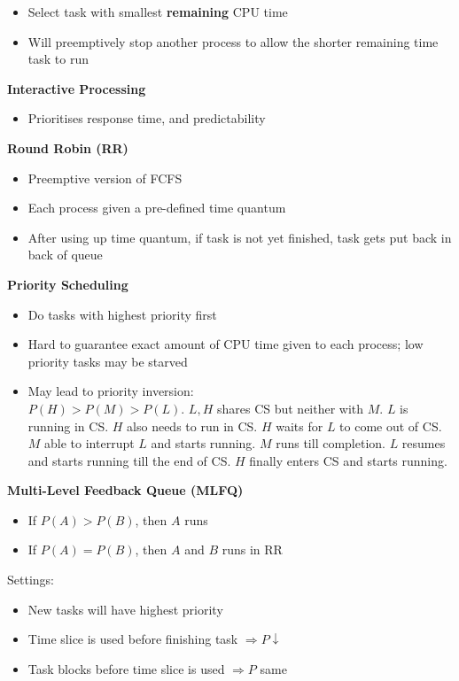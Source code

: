 \documentclass[a4paper, 12pt]{article}
\begin{document}
\begin{multicols*}{4}
\begin{itemize}
	\item Select task with smallest \textbf{remaining} CPU time
	\item Will preemptively stop another process to allow the shorter remaining time task to run
\end{itemize}
\textbf{Interactive Processing}
\begin{itemize}
	\item Prioritises response time, and predictability
\end{itemize}
\textbf{Round Robin (RR)}
\begin{itemize}
	\item Preemptive version of FCFS
	\item Each process given a pre-defined time quantum
	\item After using up time quantum, if task is not yet finished, task gets put back in back of queue
\end{itemize}
\textbf{Priority Scheduling}
\begin{itemize}
	\item Do tasks with highest priority first
	\item Hard to guarantee exact amount of CPU time given to each process; low priority tasks may be starved
	\item May lead to priority inversion: \\
		$P(H) > P(M) > P(L)$. $L,H$ shares CS but neither with $M$. $L$ is running in CS. $H$ also needs to run in CS. $H$ waits for $L$ to come out of CS. $M$ able to interrupt $L$ and starts running. $M$ runs till completion. $L$ resumes and starts running till the end of CS. $H$ finally enters CS and starts running.
\end{itemize}
\textbf{Multi-Level Feedback Queue (MLFQ)}
\begin{itemize}
	\item If $P(A) > P(B)$, then $A$ runs
	\item If $P(A) = P(B)$, then $A$ and $B$ runs in RR
\end{itemize}
Settings:
\begin{itemize}
	\item New tasks will have highest priority
	\item Time slice is used before finishing task $\Rightarrow P \downarrow$
	\item Task blocks before time slice is used $\Rightarrow P$ same
\end{itemize}

\medskip


\end{multicols*}
\end{document}
